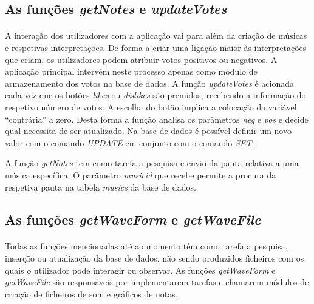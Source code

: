 \documentclass[11pt,openany,twoside]{report}
\begin{document}
\subsection{As funções \textit{getNotes} e \textit{updateVotes}}
\paragraph{ } A interação dos utilizadores com a aplicação vai para além da criação de músicas e respetivas interpretações. De forma a criar uma ligação maior às interpretações que criam, os utilizadores podem atribuir votos positivos ou negativos. A aplicação principal intervém neste processo apenas como módulo de armazenamento dos votos na base de dados. A função \textit{updateVotes} é acionada cada vez que os botões \textit{likes} ou \textit{dislikes} são premidos, recebendo a informação do respetivo número de votos. A escolha do botão implica a colocação da variável “contrária” a zero. Desta forma a função analisa os parâmetros \textit{neg} e \textit{pos} e decide qual necessita de ser atualizado. Na base de dados é possível definir um novo valor com o comando \textit{UPDATE} em conjunto com o comando \textit{SET}. 

A função \textit{getNotes} tem como tarefa a pesquisa e envio da pauta relativa a uma música específica. O parâmetro \textit{musicid} que recebe permite a procura da respetiva pauta na tabela \textit{musics} da base de dados.

\subsection{As funções \textit{getWaveForm} e \textit{getWaveFile}}
\paragraph{ } Todas as funções mencionadas até ao momento têm como tarefa a pesquisa, inserção ou atualização da base de dados, não sendo produzidos ficheiros com os quais o utilizador pode interagir ou observar. As funções \textit{getWaveForm} e \textit{getWaveFile} são responsáveis por implementarem tarefas e chamarem módulos de criação de ficheiros de som e gráficos de notas.
\end{document}
